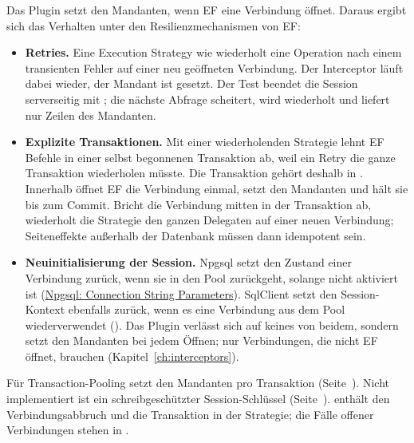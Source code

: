 Das Plugin setzt den Mandanten, wenn EF eine Verbindung öffnet. Daraus ergibt sich das Verhalten
unter den Resilienzmechanismen von EF:

\begin{itemize}
  \item \textbf{Retries.} Eine Execution Strategy wie 
    wiederholt eine Operation nach einem transienten Fehler auf einer neu geöffneten Verbindung.
    Der Interceptor läuft dabei wieder, der Mandant ist gesetzt. Der Test beendet die Session
    serverseitig mit ; die nächste Abfrage
    scheitert, wird wiederholt und liefert nur Zeilen des Mandanten.
  \item \textbf{Explizite Transaktionen.} Mit einer wiederholenden Strategie lehnt EF Befehle in
    einer selbst begonnenen Transaktion ab, weil ein Retry die ganze Transaktion wiederholen
    müsste. Die Transaktion gehört deshalb in
    .
    Innerhalb öffnet EF die Verbindung einmal, setzt den Mandanten und hält sie bis zum Commit.
    Bricht die Verbindung mitten in der Transaktion ab, wiederholt die Strategie den ganzen
    Delegaten auf einer neuen Verbindung; Seiteneffekte außerhalb der Datenbank müssen dann
    idempotent sein.
  \item \textbf{Neuinitialisierung der Session.} Npgsql setzt den Zustand einer Verbindung
    zurück, wenn sie in den Pool zurückgeht, solange  nicht aktiviert
    ist (\href{https://www.npgsql.org/doc/connection-string-parameters.html}{Npgsql: Connection String Parameters}).
    SqlClient setzt den Session-Kontext ebenfalls zurück, wenn es eine Verbindung aus dem Pool
    wiederverwendet (). Das Plugin verlässt sich
    auf keines von beidem, sondern setzt den Mandanten bei jedem Öffnen; nur Verbindungen, die
    nicht EF öffnet, brauchen
     (Kapitel~\ref{ch:interceptors}).
\end{itemize}

Für Transaction-Pooling setzt 
den Mandanten pro Transaktion (Seite~\pageref{sec:transaction-pooling}). Nicht implementiert ist
ein schreibgeschützter Session-Schlüssel (Seite~\pageref{sec:threat-model}).
 enthält den Verbindungsabbruch und die Transaktion in der
Strategie; die Fälle offener Verbindungen stehen in
.


